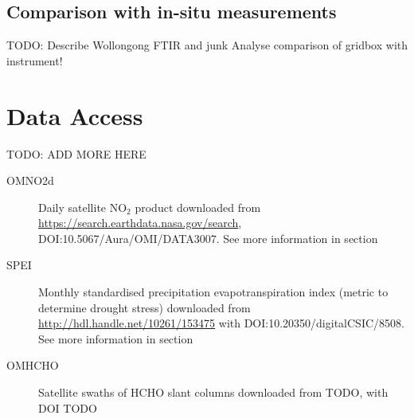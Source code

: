  \subsection{Comparison with in-situ measurements}
    TODO: Describe Wollongong FTIR and junk
    Analyse comparison of gridbox with instrument!
     
\section{Data Access}
TODO: ADD MORE HERE
\label{Model:DataAccess}
\begin{description}
  \item[OMNO2d] Daily satellite NO$_2$ product downloaded from \url{https://search.earthdata.nasa.gov/search}, DOI:10.5067/Aura/OMI/DATA3007. 
  See more information in section %
  
  \item[SPEI] Monthly standardised precipitation evapotranspiration index (metric to determine drought stress) downloaded from \url{http://hdl.handle.net/10261/153475} with DOI:10.20350/digitalCSIC/8508.
  See more information in section %
  
  \item[OMHCHO] Satellite swaths of HCHO slant columns downloaded from TODO, with DOI TODO
  
\end{description}